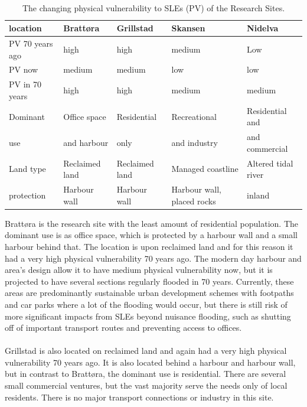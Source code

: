 \paragraph{}
\begin{table}[!ht]
    \centering
    \begin{tabular}{|l|l|l|l|l|}
    \hline
        \textbf{location} & \textbf{Brattøra} & \textbf{Grillstad} & \textbf{Skansen}  & \textbf{Nidelva} \\ \hline
        PV 70 years ago & high & high & medium & Low \\ \hline
        PV now &  medium &  medium &  low &  low \\ \hline
        PV in 70 years &  high &  high &  medium &  medium \\ \hline
        Dominant & Office space  & Residential & Recreational  & Residential and \\ \newline
        use & and harbour &  only   &  and industry & and commercial  \\ \hline
        Land type & Reclaimed land & Reclaimed land & Managed coastline  & Altered tidal river \\ \hline
        protection & Harbour wall & Harbour wall & Harbour wall, placed rocks & inland \\ \hline
    \end{tabular}
    \caption{The changing physical vulnerability to SLEs (PV) of the Research Sites.}
    \label{table:research-sites}
\end{table}

Brattøra is the research site with the least amount of residential population. The dominant use is as office space, which is protected by a harbour wall and a small harbour behind that. The location is upon reclaimed land and for this reason it had a very high physical vulnerability 70 years ago. The modern day harbour and area's design allow it to have medium physical vulnerability now, but it is projected to have several sections regularly flooded in 70 years. Currently, these areas are predominantly sustainable urban development schemes with footpaths and car parks where a lot of the flooding would occur, but there is still risk of more significant impacts from SLEs beyond nuisance flooding, such as shutting off of important transport routes and preventing access to offices.
\paragraph{}
Grillstad is also located on reclaimed land and again had a very high physical vulnerability 70 years ago. It is also located behind a harbour and harbour wall, but in contrast to  Brattøra, the dominant use is residential. There are several small commercial ventures, but the vast majority serve the needs only of local residents. There is no major transport connections or industry in this site. 
